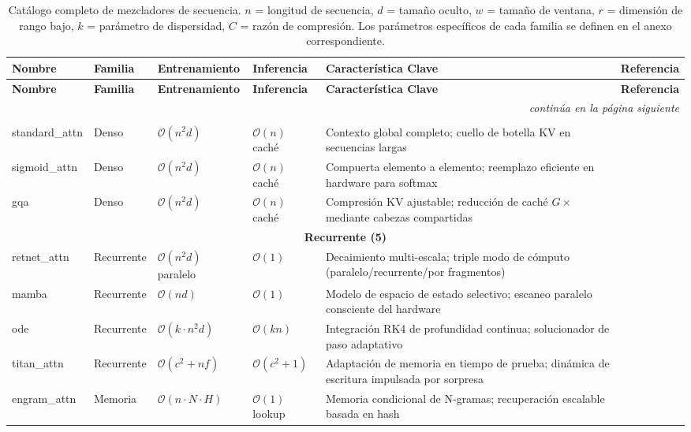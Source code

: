 \footnotesize
\begin{longtable}{p{2.0cm}p{1.3cm}p{2.2cm}p{2.2cm}p{4.0cm}p{2.5cm}}
\toprule
\textbf{Nombre} & \textbf{Familia} & \textbf{Entrenamiento} & \textbf{Inferencia} & \textbf{Característica Clave} & \textbf{Referencia} \\
\midrule
\endfirsthead
\toprule
\textbf{Nombre} & \textbf{Familia} & \textbf{Entrenamiento} & \textbf{Inferencia} & \textbf{Característica Clave} & \textbf{Referencia} \\
\midrule
\endhead
\midrule
\multicolumn{6}{r}{\textit{continúa en la página siguiente}} \\
\endfoot
\bottomrule
\caption{Catálogo completo de mezcladores de secuencia. $n$ = longitud de secuencia, $d$ = tamaño oculto, $w$ = tamaño de ventana, $r$ = dimensión de rango bajo, $k$ = parámetro de dispersidad, $C$ = razón de compresión. Los parámetros específicos de cada familia se definen en el anexo correspondiente.}
\label{tab:all-mixers}
\endlastfoot

\multicolumn{6}{c}{\textbf{Denso (3)}} \\
\midrule
standard\_attn & Denso & $\mathcal{O}(n^2 d)$ & $\mathcal{O}(n)$ caché & Contexto global completo; cuello de botella KV en secuencias largas & \citep{vaswani_attention_2017} \\
sigmoid\_attn & Denso & $\mathcal{O}(n^2 d)$ & $\mathcal{O}(n)$ caché & Compuerta elemento a elemento; reemplazo eficiente en hardware para softmax & \citep{ramapuram_theory_2024} \\
gqa & Denso & $\mathcal{O}(n^2 d)$ & $\mathcal{O}(n)$ caché & Compresión KV ajustable; reducción de caché $G\times$ mediante cabezas compartidas & \citep{ainslie_gqa_2023} \\
\midrule

\multicolumn{6}{c}{\textbf{Recurrente (5)}} \\
\midrule
retnet\_attn & Recurrente & $\mathcal{O}(n^2 d)$ paralelo & $\mathcal{O}(1)$ & Decaimiento multi-escala; triple modo de cómputo (paralelo/recurrente/por fragmentos) & \citep{sun_retentive_2023} \\
mamba & Recurrente & $\mathcal{O}(n d)$ & $\mathcal{O}(1)$ & Modelo de espacio de estado selectivo; escaneo paralelo consciente del hardware & \citep{gu_mamba_2023} \\
ode & Recurrente & $\mathcal{O}(k \cdot n^2 d)$ & $\mathcal{O}(k n)$ & Integración RK4 de profundidad continua; solucionador de paso adaptativo & \citep{zhang_continuous_2021} \\
titan\_attn & Recurrente & $\mathcal{O}(c^2 + n f)$ & $\mathcal{O}(c^2 + 1)$ & Adaptación de memoria en tiempo de prueba; dinámica de escritura impulsada por sorpresa & \citep{behrouz_titans_2025} \\
engram\_attn & Memoria & $\mathcal{O}(n \cdot N \cdot H)$ & $\mathcal{O}(1)$ lookup & Memoria condicional de N-gramas; recuperación escalable basada en hash & \citep{cheng2026conditionalmemoryscalablelookup} \\
\midrule


\end{longtable}
